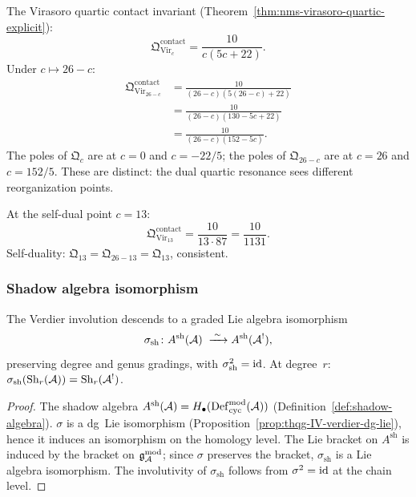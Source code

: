 \begin{computation}
\label{comp:thqg-IV-quartic-contact}
The Virasoro quartic contact invariant (Theorem~\ref{thm:nms-virasoro-quartic-explicit}):
\[
\mathfrak{Q}^{\mathrm{contact}}_{\mathrm{Vir}_c}
= \frac{10}{c(5c + 22)}.
\]
Under $c \mapsto 26 - c$:
\begin{align*}
\mathfrak{Q}^{\mathrm{contact}}_{\mathrm{Vir}_{26-c}}
&= \frac{10}{(26-c)(5(26-c) + 22)} \\[4pt]
&= \frac{10}{(26-c)(130-5c+22)} \\[4pt]
&= \frac{10}{(26-c)(152-5c)}.
\end{align*}
The poles of $\mathfrak{Q}_c$ are at $c = 0$ and $c = -22/5$;
the poles of $\mathfrak{Q}_{26-c}$ are at $c = 26$ and $c = 152/5$.
These are distinct: the dual quartic resonance sees different
reorganization points.

At the self-dual point $c = 13$:
\[
\mathfrak{Q}^{\mathrm{contact}}_{\mathrm{Vir}_{13}}
= \frac{10}{13 \cdot 87}
= \frac{10}{1131}.
\]
Self-duality: $\mathfrak{Q}_{13} = \mathfrak{Q}_{26-13} = \mathfrak{Q}_{13}$,
consistent.
\end{computation}

\subsubsection{Shadow algebra isomorphism}

\begin{proposition}
\label{prop:thqg-IV-shadow-algebra-iso}
The Verdier involution descends to a graded Lie algebra isomorphism
\begin{equation}\label{eq:thqg-IV-shadow-algebra-iso}
\sigma_{\mathrm{sh}}\colon
A^{\mathrm{sh}}(\mathcal{A})
\;\xrightarrow{\;\sim\;}
A^{\mathrm{sh}}(\mathcal{A}^!),
\end{equation}
preserving degree and genus gradings, with $\sigma_{\mathrm{sh}}^2 = \mathrm{id}$.
At degree~$r$:
$\sigma_{\mathrm{sh}}(\mathrm{Sh}_r(\mathcal{A})) = \mathrm{Sh}_r(\mathcal{A}^!)$.
\end{proposition}

\begin{proof}
The shadow algebra $A^{\mathrm{sh}}(\mathcal{A}) = H_\bullet(\mathrm{Def}_{\mathrm{cyc}}^{\mathrm{mod}}(\mathcal{A}))$
(Definition~\ref{def:shadow-algebra}).
$\sigma$ is a dg~Lie isomorphism
(Proposition~\ref{prop:thqg-IV-verdier-dg-lie}),
hence it induces an isomorphism on the homology level.
The Lie bracket on $A^{\mathrm{sh}}$ is induced by the bracket on $\mathfrak{g}_{\mathcal{A}}^{\mathrm{mod}}$;
since $\sigma$ preserves the bracket, $\sigma_{\mathrm{sh}}$ is a Lie algebra
isomorphism. The involutivity of $\sigma_{\mathrm{sh}}$ follows from
$\sigma^2 = \mathrm{id}$ at the chain level.
\end{proof}

